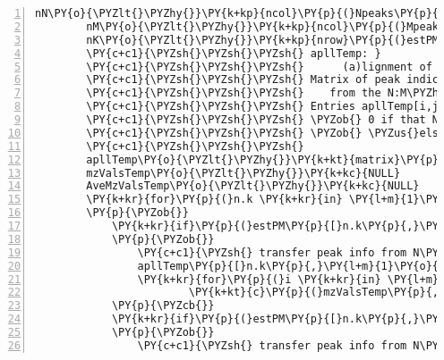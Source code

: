 \begin{Verbatim}[commandchars=\\\{\},codes={\catcode`\$=3\catcode`\^=7\catcode`\_=8},gobble=0,numbers=left,fontfamily=fvm,fontshape=n,fontsize=\footnotesize,tabsize=2]
		nN\PY{o}{\PYZlt{}\PYZhy{}}\PY{k+kp}{ncol}\PY{p}{(}Npeaks\PY{p}{)} \PY{c+c1}{\PYZsh{}\PYZsh{}\PYZsh{} no. of peaks in N\PYZhy{}align}
		nM\PY{o}{\PYZlt{}\PYZhy{}}\PY{k+kp}{ncol}\PY{p}{(}Mpeaks\PY{p}{)} \PY{c+c1}{\PYZsh{}\PYZsh{}\PYZsh{} no. of peaks in M\PYZhy{}align}
		nK\PY{o}{\PYZlt{}\PYZhy{}}\PY{k+kp}{nrow}\PY{p}{(}estPM\PY{p}{)}  \PY{c+c1}{\PYZsh{}\PYZsh{}\PYZsh{} no. of peaks in new N:M\PYZhy{}align}
		\PY{c+c1}{\PYZsh{}\PYZsh{}\PYZsh{} apllTemp: }
		\PY{c+c1}{\PYZsh{}\PYZsh{}\PYZsh{}      (a)lignment of (p)eak (l)ist (l)ist, (temp)orary}
		\PY{c+c1}{\PYZsh{}\PYZsh{}\PYZsh{} Matrix of peak indicators. The $n_K$ rows represent the $n_K$ peaks }
		\PY{c+c1}{\PYZsh{}\PYZsh{}\PYZsh{}    from the N:M\PYZhy{}alignment. }
		\PY{c+c1}{\PYZsh{}\PYZsh{}\PYZsh{} Entries apllTemp[i,j] are ==}
		\PY{c+c1}{\PYZsh{}\PYZsh{}\PYZsh{} \PYZob{} 0 if that N:M\PYZhy{}aligned peak does not exist in spec $j$ (column $j$)}
		\PY{c+c1}{\PYZsh{}\PYZsh{}\PYZsh{} \PYZob{} \PYZus{}else\PYZus{} a non\PYZhy{}zero indicator, the peak number from within the  }
		\PY{c+c1}{\PYZsh{}\PYZsh{}\PYZsh{}                           1\PYZhy{}alignment from spectrum $j$ (column $j$)}
		apllTemp\PY{o}{\PYZlt{}\PYZhy{}}\PY{k+kt}{matrix}\PY{p}{(}\PY{l+m}{0}\PY{p}{,}nrow\PY{o}{=}nK\PY{p}{,}ncol\PY{o}{=}nN\PY{o}{+}nM\PY{p}{)}
		mzValsTemp\PY{o}{\PYZlt{}\PYZhy{}}\PY{k+kc}{NULL}
		AveMzValsTemp\PY{o}{\PYZlt{}\PYZhy{}}\PY{k+kc}{NULL}
		\PY{k+kr}{for}\PY{p}{(}n.k \PY{k+kr}{in} \PY{l+m}{1}\PY{o}{:}nK\PY{p}{)}
		\PY{p}{\PYZob{}}
			\PY{k+kr}{if}\PY{p}{(}estPM\PY{p}{[}n.k\PY{p}{,}\PY{l+m}{1}\PY{p}{]}\PY{o}{\PYZgt{}}\PY{l+m}{0}\PY{p}{)} \PY{c+c1}{\PYZsh{} if the peak exists in the N\PYZhy{}alignment}
			\PY{p}{\PYZob{}}
				\PY{c+c1}{\PYZsh{} transfer peak info from N\PYZhy{}align to new N:M\PYZhy{}align matrix}
				apllTemp\PY{p}{[}n.k\PY{p}{,}\PY{l+m}{1}\PY{o}{:}nN\PY{p}{]}\PY{o}{\PYZlt{}\PYZhy{}}Npeaks\PY{p}{[}estPM\PY{p}{[}n.k\PY{p}{,}\PY{l+m}{1}\PY{p}{]}\PY{p}{,}\PY{p}{]}
				\PY{k+kr}{for}\PY{p}{(}i \PY{k+kr}{in} \PY{l+m}{1}\PY{o}{:}nN\PY{p}{)} \PY{k+kr}{if}\PY{p}{(}apllTemp\PY{p}{[}n.k\PY{p}{,}i\PY{p}{]}\PY{o}{\PYZgt{}}\PY{l+m}{0}\PY{p}{)} mzValsTemp\PY{o}{\PYZlt{}\PYZhy{}}
						\PY{k+kt}{c}\PY{p}{(}mzValsTemp\PY{p}{,}Npeaklist\PY{p}{[[}i\PY{p}{]]}\PY{p}{[}\PY{l+m}{1}\PY{p}{,}apllTemp\PY{p}{[}n.k\PY{p}{,}i\PY{p}{]]}\PY{p}{)}
			\PY{p}{\PYZcb{}}
			\PY{k+kr}{if}\PY{p}{(}estPM\PY{p}{[}n.k\PY{p}{,}\PY{l+m}{2}\PY{p}{]}\PY{o}{\PYZgt{}}\PY{l+m}{0}\PY{p}{)} \PY{c+c1}{\PYZsh{} if the peak exists in the M\PYZhy{}alignment}
			\PY{p}{\PYZob{}}
				\PY{c+c1}{\PYZsh{} transfer peak info from N\PYZhy{}align to new N:M\PYZhy{}align matrix}

\end{Verbatim}
